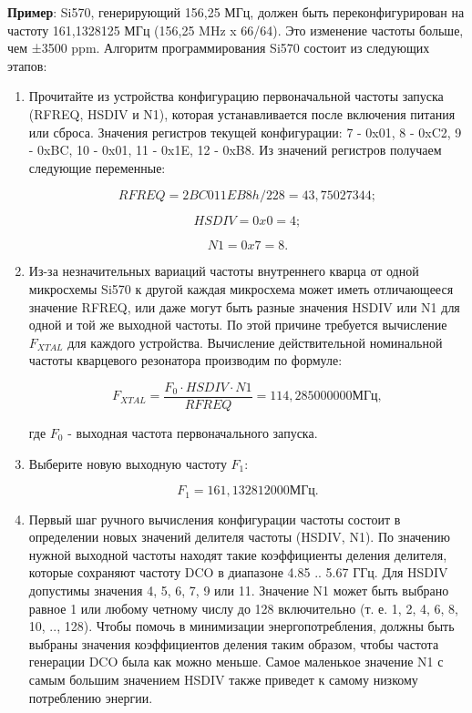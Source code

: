 \textbf{Пример}: Si570, генерирующий 156,25 МГц, должен быть переконфигурирован на частоту 161,1328125 МГц (156,25 MHz x 66/64). Это изменение частоты больше, чем ±3500 ppm. Алгоритм программирования Si570 состоит из следующих этапов:

\begin{enumerate}
	\item Прочитайте из устройства конфигурацию первоначальной частоты запуска (RFREQ, HSDIV и N1), которая устанавливается после включения питания или сброса. Значения регистров текущей конфигурации: 7 - 0x01, 8 - 0xC2, 9 - 0xBC, 10 - 0x01,
	11 - 0x1E, 12 - 0xB8. Из значений регистров получаем следующие переменные:

	\begin{equation}	
		RFREQ = 2BC011EB8h / 228 = 43,75027344;
	\end{equation}
	
	\begin{equation}	
		HSDIV = 0x0 = 4;
	\end{equation}
	
	\begin{equation}	
		N1    = 0x7 = 8.
	\end{equation}

	\item Из-за незначительных вариаций частоты внутреннего кварца от одной микросхемы Si570 к другой каждая микросхема может иметь отличающееся значение RFREQ, или даже могут быть разные значения HSDIV или N1 для одной и той же выходной частоты. По этой причине требуется вычисление \(F_{XTAL}\) для каждого устройства. Вычисление действительной номинальной частоты кварцевого резонатора производим по формуле:

	\begin{equation}	
		F_{XTAL} = \frac{F_{0} \cdot HSDIV \cdot N1}{RFREQ} = 114,285000000 МГц,
	\end{equation}

	где \(F_{0}\) - выходная частота первоначального запуска.

	\item Выберите новую выходную частоту \(F_{1}\):

	\begin{equation}	
		F_{1} = 161,132812000 МГц.
	\end{equation}

	\item Первый шаг ручного вычисления конфигурации частоты состоит в определении новых значений делителя частоты (HSDIV, N1). По значению нужной выходной частоты находят такие коэффициенты деления делителя, которые сохраняют частоту DCO в диапазоне 4.85 .. 5.67 ГГц. Для HSDIV допустимы значения 4, 5, 6, 7, 9 или 11. Значение N1 может быть выбрано равное 1 или любому четному числу до 128 включительно (т. е. 1, 2, 4, 6, 8, 10, .., 128). Чтобы помочь в минимизации энергопотребления, должны быть выбраны значения коэффициентов деления таким образом, чтобы частота генерации DCO была как можно меньше. Самое маленькое значение N1 с самым большим значением HSDIV также приведет к самому низкому потреблению энергии.


\end{enumerate}

